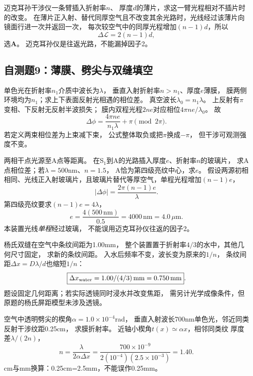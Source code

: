 \problemtext 迈克耳孙干涉仪一条臂插入折射率$n$、
厚度$d$的薄片，求这一臂光程相对不插片时的改变。
\workings
在薄片正入射、替代同厚空气且不改变其余光路时，光线经过该薄片向镜面行进一次并返回一次，
每次较空气中的同厚光程增加$(n-1)d$，所以
\[
\boxed{\Delta\mathcal L=2(n-1)d},
\]
选\textbf{A}。
\crosscheck 迈克耳孙仪是往返光路，不能漏掉因子2。

\subsection{自测题9：薄膜、劈尖与双缝填空}

\problemtext 单色光在折射率$n_1$介质中波长为$\lambda$，
垂直入射折射率$n>n_1$、厚度$e$薄膜，
膜两侧环境均为$n_1$；求上下表面反射光相遇的相位差。
\workings
真空波长$\lambda_0=n_1\lambda$。
上反射有$\pi$变相、下反射无反射半波损失；
膜内双程光程$2ne$对应相位$4\pi ne/\lambda_0$。
故
\[
\boxed{\Delta\phi=\frac{4\pi ne}{n_1\lambda}+\pi
\pmod{2\pi}}.
\]
\crosscheck 若定义两束相位差为上束减下束，
公式整体取负或把$\pi$换成$-\pi$，
但干涉可观测强度不变。

\problemtext 两相干点光源至A点等距离。
在S$_1$到A的光路插入厚度$e$、折射率$n$的玻璃片，
求A点相位差；若$\lambda=500$nm、$n=1.5$，
A恰为第四级亮纹中心，求$e$。
\workings
假设两源初相相同、光线正入射玻璃片，且玻璃片替代等厚空气，单程光程增加$(n-1)e$，
\[
\boxed{|\Delta\phi|=\frac{2\pi(n-1)e}{\lambda}}.
\]
第四级亮纹要求$(n-1)e=4\lambda$，
\[
\boxed{e=\frac{4(500\,\mathrm{nm})}{0.5}
=4000\,\mathrm{nm}=4.0\,\mu\mathrm m}.
\]
\crosscheck 本装置光线\emph{单程}经过玻璃，
不能误用迈克耳孙仪往返的因子2。

\problemtext 杨氏双缝在空气中条纹间距为1.00mm，
整个装置置于折射率$4/3$的水中，其他几何尺寸固定，
求新的条纹间距。
\workings
入水后频率不变，波长变为原来的$1/n$，
条纹间距$\Delta x=D\lambda/d$也缩短$1/n$：
\[
\boxed{\Delta x_{\rm water}=1.00/(4/3)\,\mathrm{mm}
=0.750\,\mathrm{mm}}.
\]
\crosscheck 题设固定几何距离；若实际透镜同时浸水并改变焦距，
需另计光学成像条件，但原题的杨氏屏距模型未涉及透镜。

\problemtext 空气中透明劈尖的楔角$\alpha=1.0\times10^{-4}$rad，
垂直入射波长700nm单色光，邻近同类反射干涉纹距0.25cm，
求膜折射率。
\workings
近轴小楔角$t(x)\simeq\alpha x$，相邻同类纹
厚度差$\lambda/(2n)$，
\[
\boxed{n=\frac{\lambda}{2\alpha\Delta x}
=\frac{700\times10^{-9}}{2(10^{-4})(2.5\times10^{-3})}
=1.40}.
\]
\crosscheck cm与mm换算：0.25cm=2.5mm，不能误作0.25mm。

